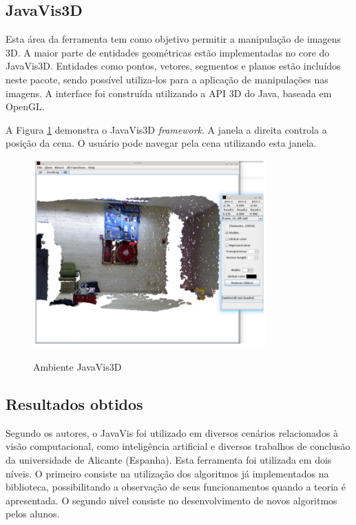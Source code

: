 \documentclass[
	12pt,				%
	oneside,			%
	a4paper,			%
	english,			%
	french,				%
	spanish,			%
	brazil,				%
	]{abntex2}
\begin{document}
\subsection{JavaVis3D}

Esta área da ferramenta tem como objetivo permitir a manipulação de imagens 3D. A maior parte de entidades geométricas estão implementadas no core do JavaVis3D. Entidades como pontos, vetores, segmentos e planos estão incluídos neste pacote, sendo possível utiliza-los para a aplicação de manipulações nas imagens. A interface foi construída utilizando a API 3D do Java, baseada em OpenGL.

A Figura \ref{fig:javavis_3d} demonstra o JavaVis3D \textit{framework}. A janela a direita controla a posição da cena. O usuário pode navegar pela cena utilizando esta janela.

\begin{figure}[ht]
\centering
\caption{Ambiente JavaVis3D}
\includegraphics[width=0.8\textwidth]{imagens/javavis_3d.png}
\label{fig:javavis_3d}
\end{figure}

\subsection{Resultados obtidos}

Segundo os autores, o JavaVis foi utilizado em diversos cenários relacionados à visão computacional, como inteligência artificial e diversos trabalhos de conclusão da universidade de Alicante (Espanha). Esta ferramenta foi utilizada em dois níveis. O primeiro consiste na utilização dos algoritmos já implementados na biblioteca, possibilitando a observação de seus funcionamentos quando a teoria é apresentada. O segundo nível consiste no desenvolvimento de novos algoritmos pelos alunos.
\end{document}
